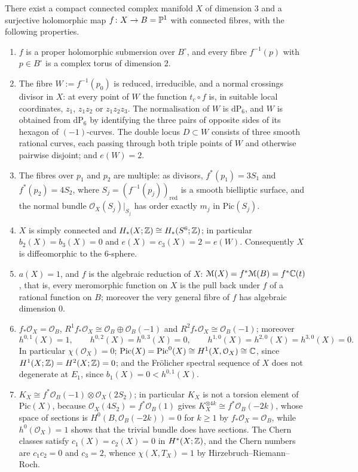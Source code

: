 \begin{theorem}
There exist a compact connected complex manifold $X$ of dimension $3$ and a surjective holomorphic map $f\colon X \to B = \mathbb{P}^1$ with connected fibres, with the following properties.
\begin{enumerate}[label=(\arabic*)]
\item $f$ is a proper holomorphic submersion over $B^\circ$, and every fibre $f^{-1}(p)$ with $p \in B^\circ$ is a complex torus of dimension $2$.
\item The fibre $W := f^{-1}(p_0)$ is reduced, irreducible, and a normal crossings divisor in $X$: at every point of $W$ the function $t_c \circ f$ is, in suitable local coordinates, $z_1$, $z_1 z_2$ or $z_1 z_2 z_3$. The normalisation of $W$ is $\mathrm{dP}_6$, and $W$ is obtained from $\mathrm{dP}_6$ by identifying the three pairs of opposite sides of its hexagon of $(-1)$-curves. The double locus $D \subset W$ consists of three smooth rational curves, each passing through both triple points of $W$ and otherwise pairwise disjoint; and $e(W) = 2$.
\item The fibres over $p_1$ and $p_2$ are multiple: as divisors, $f^*(p_1) = 3S_1$ and $f^*(p_2) = 4S_2$, where $S_j = (f^{-1}(p_j))_{\mathrm{red}}$ is a smooth bielliptic surface, and the normal bundle $\mathcal O_X(S_j)|_{S_j}$ has order exactly $m_j$ in $\mathrm{Pic}(S_j)$.
\item $X$ is simply connected and $H_*(X;\mathbb{Z}) \cong H_*(S^6;\mathbb{Z})$; in particular $b_2(X) = b_3(X) = 0$ and $e(X) = c_3(X) = 2 = e(W)$. Consequently $X$ is diffeomorphic to the $6$-sphere.
\item $a(X) = 1$, and $f$ is the algebraic reduction of $X$: $\mathcal M(X) = f^*\mathcal M(B) = f^*\mathbb{C}(t)$, that is, every meromorphic function on $X$ is the pull back under $f$ of a rational function on $B$; moreover the very general fibre of $f$ has algebraic dimension $0$.
\item $f_*\mathcal O_X = \mathcal O_B$, $R^1 f_*\mathcal O_X \cong \mathcal O_B \oplus \mathcal O_B(-1)$ and $R^2 f_*\mathcal O_X \cong \mathcal O_B(-1)$; moreover
\[
h^{0,1}(X) = 1, \qquad h^{0,2}(X) = h^{0,3}(X) = 0, \qquad h^{1,0}(X) = h^{2,0}(X) = h^{3,0}(X) = 0.
\]
In particular $\chi(\mathcal O_X) = 0$; $\mathrm{Pic}(X) = \mathrm{Pic}^0(X) \cong H^1(X,\mathcal O_X) \cong \mathbb{C}$, since $H^1(X;\mathbb{Z}) = H^2(X;\mathbb{Z}) = 0$; and the Fr\"olicher spectral sequence of $X$ does not degenerate at $E_1$, since $b_1(X) = 0 < h^{0,1}(X)$.
\item $K_X \cong f^*\mathcal O_B(-1) \otimes \mathcal O_X(2S_2)$; in particular $K_X$ is not a torsion element of $\mathrm{Pic}(X)$, because $\mathcal O_X(4S_2) = f^*\mathcal O_B(1)$ gives $K_X^{\otimes 4k} \cong f^*\mathcal O_B(-2k)$, whose space of sections is $H^0(B,\mathcal O_B(-2k)) = 0$ for $k \ge 1$ by $f_*\mathcal O_X = \mathcal O_B$, while $h^0(\mathcal O_X) = 1$ shows that the trivial bundle does have sections. The Chern classes satisfy $c_1(X) = c_2(X) = 0$ in $H^*(X;\mathbb{Z})$, and the Chern numbers are $c_1 c_2 = 0$ and $c_3 = 2$, whence $\chi(X,T_X) = 1$ by Hirzebruch--Riemann--Roch.

\end{enumerate}
\end{theorem}
